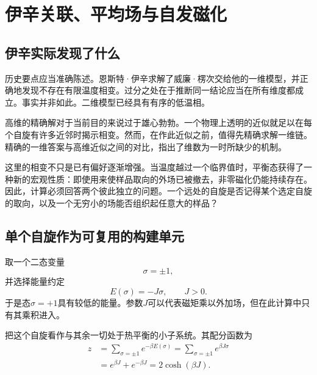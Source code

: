 \chapter{伊辛关联、平均场与自发磁化}


\section{伊辛实际发现了什么}

历史要点应当准确陈述。恩斯特·伊辛求解了威廉·楞次交给他的一维模型，并正确地发现不存在有限温度相变。过分之处在于推断同一结论应当在所有维度都成立。事实并非如此。二维模型已经具有有序的低温相。

高维的精确解对于当前目的来说过于雄心勃勃。一个物理上透明的近似就足以在每个自旋有许多近邻时揭示相变。然而，在作此近似之前，值得先精确求解一维链。精确的一维答案与高维近似之间的对比，指出了维数为一时所缺少的机制。

这里的相变不只是已有偏好逐渐增强。当温度越过一个临界值时，平衡态获得了一种新的宏观性质：即使用来使样品取向的外场已被撤去，非零磁化仍能持续存在。因此，计算必须回答两个彼此独立的问题。一个远处的自旋是否记得某个选定自旋的取向，以及一个无穷小的场能否组织起任意大的样品？

\section{单个自旋作为可复用的构建单元}

取一个二态变量
\begin{equation}
\sigma=\pm1,
\end{equation}
并选择能量约定
\begin{equation}
E(\sigma)=-J\sigma,
\qquad J>0.
\end{equation}
于是态\(\sigma=+1\)具有较低的能量。参数\(J\)可以代表磁矩乘以外加场，但在此计算中只有其乘积进入。

把这个自旋看作与其余一切处于热平衡的小子系统。其配分函数为
\begin{align}
z
&=\sum_{\sigma=\pm1}e^{-\beta E(\sigma)}
 =\sum_{\sigma=\pm1}e^{\beta J\sigma} \\
&=e^{\beta J}+e^{-\beta J}
 =2\cosh(\beta J).
\end{align}

